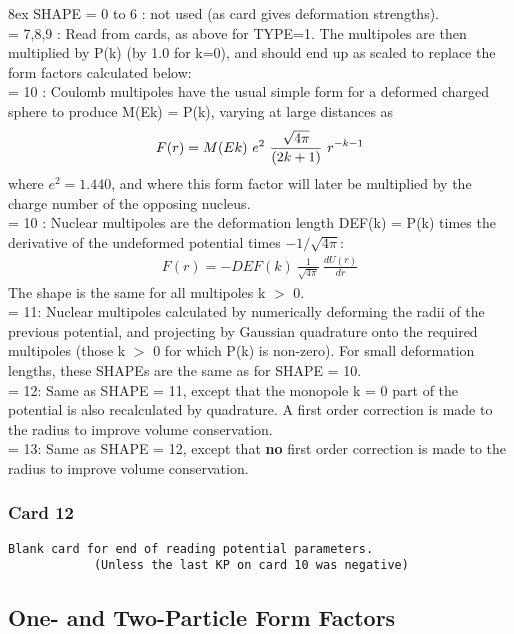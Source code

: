 \documentclass[11pt]{article}
\newcommand{\beqn}{\begin{eqnarray*}}
\newcommand{\eeqn}{\end{eqnarray*}}
\begin{document}
\hangindent 8ex
SHAPE
     = 0 to 6 : not used (as card gives deformation strengths).
\\
     = 7,8,9 : Read from cards, as above for TYPE=1.
The multipoles are then multiplied by P(k) (by 1.0 for k=0), and
should end up as scaled to replace the form factors calculated
below:
\\
= 10 : Coulomb multipoles have the usual simple form for a
deformed charged sphere to produce M(Ek) = P(k),
varying at large distances as
\beqn
      F(r) = M(Ek) ~ e^2 ~ {\sqrt{4\pi}   \over  (2k+1)}~  r^{-k-1}
\eeqn
where $e^2=1.440$, and where this form factor will later be multiplied
by the charge number of the opposing nucleus.
\\
= 10 : Nuclear multipoles are the deformation length DEF(k) = P(k)
times the derivative of the undeformed potential times $-1/\sqrt{4\pi}$:
\beqn
      F(r) = - DEF(k) ~  \frac{1}{\sqrt{4\pi}} ~ \frac{dU(r)}{dr}
\eeqn
The shape is the same for all multipoles k $>$ 0.
\\
= 11: Nuclear multipoles calculated by numerically deforming the radii
of the previous potential, and projecting by Gaussian quadrature
onto the required multipoles (those k $>$ 0 for which P(k) is non-zero).
For small deformation lengths, these SHAPEs are the same as for
SHAPE = 10.
\\
= 12: Same as SHAPE = 11, except that the monopole k = 0 part of
the potential is also recalculated by quadrature. A first order
correction is made to the radius to improve volume conservation.
\\
= 13: Same as SHAPE = 12, except that {\bf no} first order
correction is made to the radius to improve volume conservation.

\bigskip
\subsubsection*{Card 12}

\begin{verbatim}
Blank card for end of reading potential parameters.
            (Unless the last KP on card 10 was negative)
\end{verbatim}

\newpage
\subsection{One- and Two-Particle Form Factors}
%
\bigskip
\end{document}
